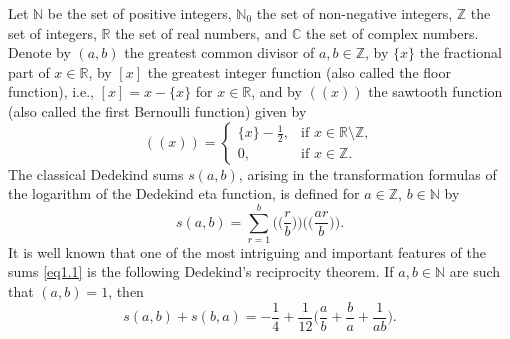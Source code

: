 \documentclass[reqno]{amsart}
\numberwithin{equation}{section}
\begin{document}
Let $\mathbb{N}$ be the set of positive integers, $\mathbb{N}_{0}$ the set of non-negative integers, $\mathbb{Z}$ the set of integers, $\mathbb{R}$ the set of real numbers, and $\mathbb{C}$ the set of complex numbers. Denote by $(a,b)$ the greatest common divisor of $a,b\in\mathbb{Z}$, by $\{x\}$ the fractional part of $x\in\mathbb{R}$, by $[x]$ the greatest integer function (also called the floor function), i.e., $[x]=x-\{x\}$ for $x\in\mathbb{R}$, and by $((x))$ the sawtooth function (also called the first Bernoulli function) given by
\begin{equation*}
((x))=\begin{cases}
\{x\}-\frac{1}{2},  &\text{if $x\in\mathbb{R}\setminus\mathbb{Z}$},\\
0,  &\text{if $x\in\mathbb{Z}$}.
\end{cases}
\end{equation*}
The classical Dedekind sums $s(a,b)$, arising in the transformation formulas of the logarithm of the Dedekind eta function, is defined for $a\in\mathbb{Z}$, $b\in\mathbb{N}$ by
\begin{equation}\label{eq1.1}
s(a,b)=\sum_{r=1}^{b}\biggl(\biggl(\frac{r}{b}\biggl)\biggl)\biggl(\biggl(\frac{ar}{b}\biggl)\biggl).
\end{equation}
It is well known that one of the most intriguing and important features of the sums \eqref{eq1.1} is the following Dedekind's \cite{dedekind} reciprocity theorem. If $a,b\in\mathbb{N}$ are such that $(a,b)=1$, then
\begin{equation}\label{eq1.2}
s(a,b)+s(b,a)=-\frac{1}{4}+\frac{1}{12}\biggl(\frac{a}{b}+\frac{b}{a}+\frac{1}{ab}\biggl).
\end{equation}
\end{document}
